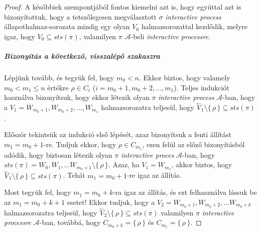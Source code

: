\documentclass[12pt]{article}
\theoremstyle{definition}
\theoremstyle{remark}
\theoremstyle{plain}
\theoremstyle{plain}
\newcommand{\backwardhat}{\overset{\leftharpoonup}}
\begin{document}
\begin{proof}
        A későbbiek szempontjából fontos kiemelni azt is, hogy egyúttal azt is bizonyítottuk, hogy a tetszőlegesen megválasztott $\sigma$ \textit{interactive process} állapothalmaz-sorozata mindig egy olyan $V_{0}$ halmazsorozattal kezdődik, melyre igaz, hogy $V_{0} \subseteq \textit{sts}(\pi)$, valamilyen $\pi$ $\mathscr{A}$-beli \textit{interactive processre}.
        \subparagraph{Bizonyítás a következő, visszalépő szakaszra}
        Lépjünk tovább, és tegyük fel, hogy $m_{0} < n$. Ekkor biztos, hogy valamely $m_{0} < m_{1} \leq n$ értékre $\rho \in C_{i}$ ($i = m_{0} + 1, m_{0} + 2, \ldots, m_{1}$). Teljes indukciót használva bizonyítsuk, hogy ekkor létezik olyan $\pi$ \textit{interactive process} $\mathscr{A}$-ban, hogy a $V_{1} = W_{m_{0} + 1}, W_{m_{0} + 2}, \ldots, W_{m_{1}}$ halmazsorozatra teljesül, hogy $\backwardhat V_{1} \setminus \{\, \rho \,\} \subseteq \textit{sts}(\pi)$.

        Először tekintsük az indukció első lépését, azaz bizonyítsuk a fenti állítást $m_{1} = m_{0} + 1$-re. Tudjuk ekkor, hogy $\rho \in C_{m_{1}}$, ezen felül az előző bizonyításból adódik, hogy biztosan létezik olyan $\pi$ \textit{interactive proces} $\mathscr{A}$-ban, hogy $\textit{sts}(\pi) = W_{0}, W_{1}, \ldots W_{m_{0} + 1} \setminus \{\,\rho\,\}$. Azaz, ha $V_{1} = W_{m_{1}}$, akkor biztos, hogy $\backwardhat V_{1} \setminus \{\,\rho\,\} \subseteq \textit{sts}(\pi)$. Tehát $m_{1} = m_{0} + 1$-re igaz az állítás.
        
        Most tegyük fel, hogy $m_{1} = m_{0} + k$-ra igaz az állítás, és ezt felhasználva lássuk be az $m_{1} = m_{0} + k + 1$ esetet! Ekkor tudjuk, hogy a $V_{2} = W_{m_{0} + 1}, W_{m_{0} + 2}, \ldots W_{m_{0} + k}$ halmazsorozatra teljesül, hogy $\backwardhat V_{2} \setminus \{ \, \rho \, \} \subseteq \textit{sts}(\pi)$ valamilyen $\pi$ \textit{interactive processre} $\mathscr{A}$-ban, továbbá, hogy $C_{m_{0} + k} = \{ \, \rho \, \}$ és $C_{m_{1}} = \{ \, \rho \,\}$.
        

\end{proof}
\end{document}
